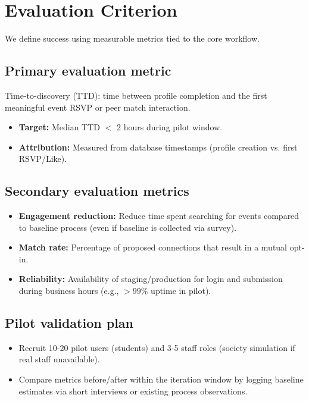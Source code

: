 \documentclass[12pt, a4paper]{article}
\begin{document}
\section{Evaluation Criterion} 
We define success using measurable metrics tied to the core workflow.

\subsection{Primary evaluation metric} 
Time-to-discovery (TTD): time between profile completion and the first meaningful event RSVP or peer match interaction.
\begin{itemize}
    \item \textbf{Target:} Median TTD $<$ 2 hours during pilot window.
    \item \textbf{Attribution:} Measured from database timestamps (profile creation vs. first RSVP/Like).
\end{itemize}

\subsection{Secondary evaluation metrics} 
\begin{itemize}
    \item \textbf{Engagement reduction:} Reduce time spent searching for events compared to baseline process (even if baseline is collected via survey).
    \item \textbf{Match rate:} Percentage of proposed connections that result in a mutual opt-in.
    \item \textbf{Reliability:} Availability of staging/production for login and submission during business hours (e.g., $>99\%$ uptime in pilot).
\end{itemize}

\subsection{Pilot validation plan} 
\begin{itemize}
    \item Recruit 10-20 pilot users (students) and 3-5 staff roles (society simulation if real staff unavailable).
    \item Compare metrics before/after within the iteration window by logging baseline estimates via short interviews or existing process observations.
\end{itemize}
\end{document}
